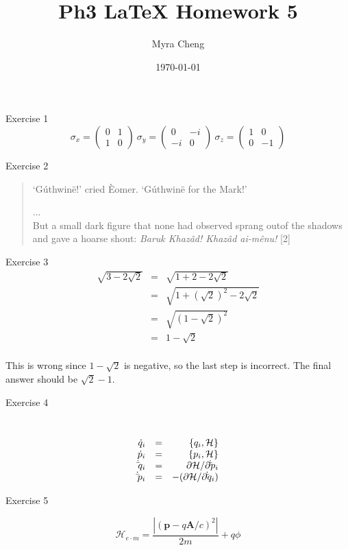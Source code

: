 \documentclass{article}
\title{Ph3 LaTeX Homework 5}
\author{Myra Cheng }
\date{\today}
\begin{document}
\maketitle

Exercise 1
$$
    \sigma_x = \left(
    \begin{array}{cc}
         0&1  \\
         1&0 
    \end{array}
    \right)~ \sigma_y = \left(
    \begin{array}{cc}
         0&-i  \\
         -i&0 
    \end{array}
    \right)~  \sigma_z = \left(
    \begin{array}{cc}
         1&0  \\
         0&-1 
    \end{array}
    \right)$$

Exercise 2
\begin{quotation}

`G\'{u}thwin\"{e}!’ cried \`{E}omer. `G\'{u}thwin\"{e} for the Mark!'

\indent \@.\@.\@.\\
\indent But a small dark figure that none had observed sprang outof the shadows and gave a hoarse shout: \textit{Baruk Khaz\^{a}d! Khaz\^{a}d ai-m\^{e}nu!} [2]
\end{quotation}
Exercise 3
\\


\begin{equation}
    \begin{array}{rcl}
\sqrt{3-2\sqrt{2}} & = & \sqrt{1+2-2\sqrt{2}}\\
& = & \sqrt{1+(\sqrt{2})^2-2\sqrt{2}} \\
& = & \sqrt{(1-\sqrt{2})^2} \\
& = & 1-\sqrt{2}

\end{array}
\end{equation}
\\
This is wrong since $1- \sqrt{2}$ is negative, so the last step is incorrect. The final answer should be $\sqrt{2} - 1.$

Exercise 4

\\

\begin{equation}
    \begin{array}{rcl}
\dot q_i & = &\hfill  \{ q_i, \mathcal{H}\}\\ 
\dot p_i & = &\hfill  \{ p_i, \mathcal{H}\}\\ 
\dot \bar q_i & = &\hfill  \partial\mathcal{H}/\partial\dot \bar p_i \\ 
\dot \bar p_i & = &- \hfill ( \partial\mathcal{H}/\partial\dot \bar q_i )\\

\end{array}
\end{equation}

Exercise 5

  $$  \mathcal{H}_{e\cdot m} = \frac{|(\mathbf{p} - q\mathbf{A}/c)^2|}{2m} + q\phi$$
\end{document}
